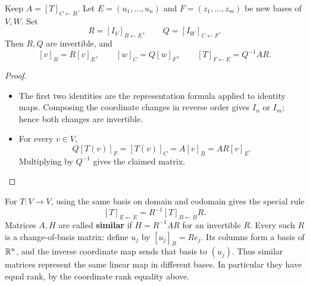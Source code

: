 \begin{theorem}\label{thm:04:change}
Keep \(A=[T]_{C\leftarrow B}\). Let \(E=(u_1,\ldots,u_n)\)
and \(F=(z_1,\ldots,z_m)\) be new bases of \(V,W\). Set
\[
R=[I_V]_{B\leftarrow E},\qquad Q=[I_W]_{C\leftarrow F}.
\]
Then \(R,Q\) are invertible, and
\[
[v]_B=R[v]_E,\qquad [w]_C=Q[w]_F,\qquad
[T]_{F\leftarrow E}=Q^{-1}AR.
\]
\end{theorem}
\begin{proof}
\begin{itemize}
\item The first two identities are the representation formula applied
  to identity maps. Composing the coordinate changes in reverse order
  gives \(I_n\) or \(I_m\); hence both changes are invertible.
\item For every \(v\in V\),
  \[
  Q[T(v)]_F=[T(v)]_C=A[v]_B=AR[v]_E.
  \]
  Multiplying by \(Q^{-1}\) gives the claimed matrix.
\end{itemize}
\end{proof}

For \(T:V\to V\), using the same basis
on domain and codomain gives the special rule
\[
[T]_{E\leftarrow E}=R^{-1}[T]_{B\leftarrow B}R.
\]
Matrices \(A,H\) are called \textbf{similar} if \(H=R^{-1}AR\) for an
invertible \(R\).
Every such \(R\) is a change-of-basis matrix: define \(u_j\) by
\([u_j]_B=Re_j\). Its columns form a basis of \(\mathbb R^n\), and the inverse
coordinate map sends that basis to \((u_j)\).
Thus similar matrices represent the same linear map in different bases.
In particular they have equal rank, by the coordinate rank equality above.

